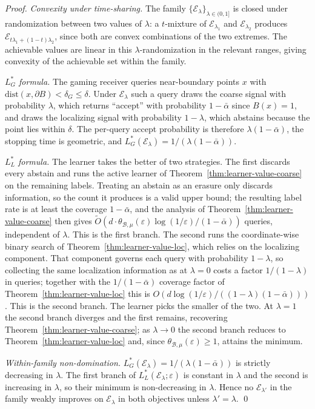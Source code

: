 \documentclass[runningheads,envcountsame]{llncs}
\newcommand{\cB}{\mathcal{B}}
\newcommand{\cE}{\mathcal{E}}
\newcommand{\eps}{\varepsilon}
\newcommand{\dis}{\theta}
\begin{document}
\begin{proof}
\emph{Convexity under time-sharing.} The family $\{\cE_\lambda\}_{\lambda \in (0,1]}$ is closed under randomization between two values of $\lambda$: a $t$-mixture of $\cE_{\lambda_1}$ and $\cE_{\lambda_2}$ produces $\cE_{t \lambda_1 + (1-t)\lambda_2}$, since both are convex combinations of the two extremes. The achievable values are linear in this $\lambda$-randomization in the relevant ranges, giving convexity of the achievable set within the family.

{\sloppy \emph{$L^*_G$ formula.} The gaming receiver queries near-boundary points $x$ with $\mathrm{dist}(x, \partial B) < \delta_G \leq \delta$. Under $\cE_\lambda$ such a query draws the coarse signal with probability $\lambda$, which returns ``accept'' with probability $1-\bar\alpha$ since $B(x) = 1$, and draws the localizing signal with probability $1-\lambda$, which abstains because the point lies within $\delta$. The per-query accept probability is therefore $\lambda(1-\bar\alpha)$, the stopping time is geometric, and $L^*_G(\cE_\lambda) = 1/(\lambda(1-\bar\alpha))$.\par}

\emph{$L^*_L$ formula.} The learner takes the better of two strategies. The first discards every abstain and runs the active learner of Theorem~\ref{thm:learner-value-coarse} on the remaining labels. Treating an abstain as an erasure only discards information, so the count it produces is a valid upper bound; the resulting label rate is at least the coverage $1-\bar\alpha$, and the analysis of Theorem~\ref{thm:learner-value-coarse} then gives $\tilde O\!\left(d \cdot \dis_{\cB,\mu}(\eps)\log(1/\eps)/(1-\bar\alpha)\right)$ queries, independent of $\lambda$. This is the first branch. The second runs the coordinate-wise binary search of Theorem~\ref{thm:learner-value-loc}, which relies on the localizing component. That component governs each query with probability $1-\lambda$, so collecting the same localization information as at $\lambda = 0$ costs a factor $1/(1-\lambda)$ in queries; together with the $1/(1-\bar\alpha)$ coverage factor of Theorem~\ref{thm:learner-value-loc} this is $O\!\left(d\log(1/\eps)/((1-\lambda)(1-\bar\alpha))\right)$. This is the second branch. The learner picks the smaller of the two. At $\lambda = 1$ the second branch diverges and the first remains, recovering Theorem~\ref{thm:learner-value-coarse}; as $\lambda \to 0$ the second branch reduces to Theorem~\ref{thm:learner-value-loc} and, since $\dis_{\cB,\mu}(\eps) \geq 1$, attains the minimum.

\emph{Within-family non-domination.} $L^*_G(\cE_\lambda) = 1/(\lambda(1-\bar\alpha))$ is strictly decreasing in $\lambda$. The first branch of $L^*_L(\cE_\lambda; \eps)$ is constant in $\lambda$ and the second is increasing in $\lambda$, so their minimum is non-decreasing in $\lambda$. Hence no $\cE_{\lambda'}$ in the family weakly improves on $\cE_\lambda$ in both objectives unless $\lambda' = \lambda$. \qed
\end{proof}
\end{document}
